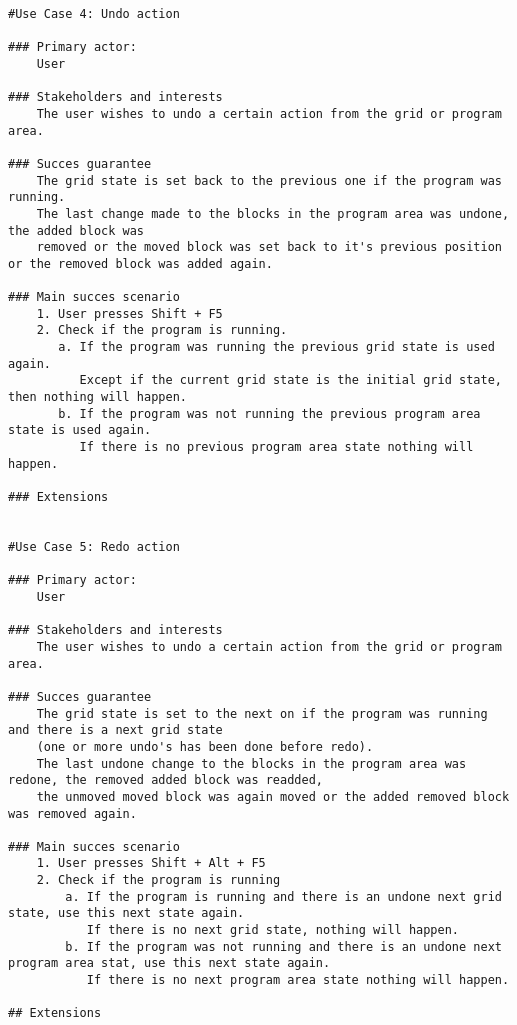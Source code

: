 \documentclass{article}
\begin{document}
\begin{verbatim}
#Use Case 4: Undo action

### Primary actor:
    User

### Stakeholders and interests
    The user wishes to undo a certain action from the grid or program area.

### Succes guarantee
    The grid state is set back to the previous one if the program was running.
    The last change made to the blocks in the program area was undone, the added block was
    removed or the moved block was set back to it's previous position or the removed block was added again.

### Main succes scenario
    1. User presses Shift + F5
    2. Check if the program is running.
       a. If the program was running the previous grid state is used again.
          Except if the current grid state is the initial grid state, then nothing will happen.
       b. If the program was not running the previous program area state is used again.
          If there is no previous program area state nothing will happen.
    
### Extensions


#Use Case 5: Redo action

### Primary actor:
    User

### Stakeholders and interests
    The user wishes to undo a certain action from the grid or program area.

### Succes guarantee
    The grid state is set to the next on if the program was running and there is a next grid state 
    (one or more undo's has been done before redo).
    The last undone change to the blocks in the program area was redone, the removed added block was readded,
    the unmoved moved block was again moved or the added removed block was removed again.

### Main succes scenario
    1. User presses Shift + Alt + F5
    2. Check if the program is running
        a. If the program is running and there is an undone next grid state, use this next state again.
           If there is no next grid state, nothing will happen.
        b. If the program was not running and there is an undone next program area stat, use this next state again.
           If there is no next program area state nothing will happen.

## Extensions

\end{verbatim}
\end{document}
